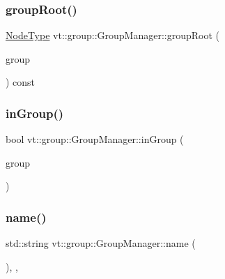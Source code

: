 \mbox{\label{structvt_1_1group_1_1_group_manager_ae813f2b894016f05569d7d06aae55315}} 
\subsubsection{\texorpdfstring{group\+Root()}{groupRoot()}}
{\footnotesize\ttfamily \hyperlink{namespacevt_a866da9d0efc19c0a1ce79e9e492f47e2}{Node\+Type} vt\+::group\+::\+Group\+Manager\+::group\+Root (\begin{DoxyParamCaption}\item[{\hyperlink{namespacevt_a27b5e4411c9b6140c49100e050e2f743}{Group\+Type} const \&}]{group }\end{DoxyParamCaption}) const}

\mbox{\label{structvt_1_1group_1_1_group_manager_a9a0520b8e8e35f0f0127db0669c9b648}} 
\subsubsection{\texorpdfstring{in\+Group()}{inGroup()}}
{\footnotesize\ttfamily bool vt\+::group\+::\+Group\+Manager\+::in\+Group (\begin{DoxyParamCaption}\item[{\hyperlink{namespacevt_a27b5e4411c9b6140c49100e050e2f743}{Group\+Type} const \&}]{group }\end{DoxyParamCaption})}

\mbox{\label{structvt_1_1group_1_1_group_manager_a46802e85936e68f9bebc844af1793da3}} 
\subsubsection{\texorpdfstring{name()}{name()}}
{\footnotesize\ttfamily std\+::string vt\+::group\+::\+Group\+Manager\+::name (\begin{DoxyParamCaption}{ }\end{DoxyParamCaption})\hspace{0.3cm}{\ttfamily [inline]}, {\ttfamily [override]}, {\ttfamily [virtual]}}



